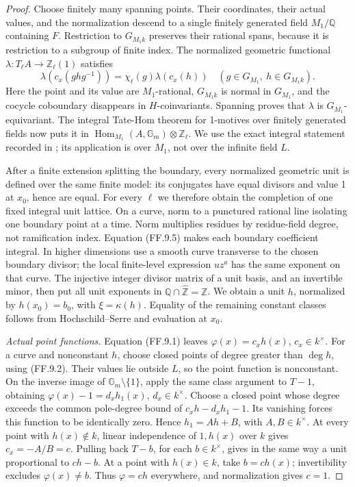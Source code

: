 \begin{proof}
Choose finitely many spanning points. Their coordinates, their
actual values, and the normalization descend to a single
finitely generated field \(M_1/\mathbb Q\) containing \(F\).
Restriction to \(G_{M_1k}\) preserves their rational spans,
because it is restriction to a subgroup of finite index.
The normalized geometric functional
\(\lambda:T_\ell A\to\mathbb Z_\ell(1)\) satisfies
\[
 \lambda(c_x(ghg^{-1}))
       =\chi_\ell(g)\lambda(c_x(h))
 \quad(g\in G_{M_1},\ h\in G_{M_1k}).
\]
Here the point and its value are \(M_1\)-rational,
\(G_{M_1k}\) is normal in \(G_{M_1}\), and the cocycle
coboundary disappears in \(H\)-coinvariants. Spanning proves
that \(\lambda\) is \(G_{M_1}\)-equivariant.
The integral Tate-Hom theorem for 1-motives over finitely generated
fields now puts it in
\(\operatorname{Hom}_{M_1}(A,\mathbb G_m)\otimes\mathbb Z_\ell\).
We use the exact integral statement recorded in
\citet[Section~1.4]{FF_Jossen2014}; its application is over
\(M_1\), not over the infinite field \(L\).

After a finite extension splitting the boundary, every normalized
geometric unit is defined over the same finite model: its conjugates
have equal divisors and value 1 at \(x_0\), hence are equal.
For every \(\ell\) we therefore obtain the completion of one
fixed integral unit lattice. On a curve, norm to a punctured
rational line isolating one boundary point at a time. Norm
multiplies residues by residue-field degree, not ramification
index. Equation (FF.9.5) makes each boundary coefficient integral.
In higher dimensions use a smooth curve transverse to the chosen
boundary divisor; the local finite-level expression \(uz^a\)
has the same exponent on that curve. The injective integer divisor
matrix of a unit basis, and an invertible minor, then put all unit
exponents in \(\mathbb Q\cap\widehat{\mathbb Z}=\mathbb Z\).
We obtain a unit \(h\), normalized by \(h(x_0)=b_0\), with
\(\xi=\kappa(h)\). Equality of the remaining constant classes
follows from Hochschild--Serre and evaluation at \(x_0\).

\emph{Actual point functions.}
Equation (FF.9.1) leaves \(\varphi(x)=c_xh(x)\), \(c_x\in k^\times\).
For a curve and nonconstant \(h\), choose closed points of
degree greater than \(\deg h\), using (FF.9.2). Their values
lie outside \(L\), so the point function is nonconstant.
On the inverse image of \(\mathbb G_m\setminus\{1\}\), apply
the same class argument to \(T-1\), obtaining
\(\varphi(x)-1=d_xh_1(x)\), \(d_x\in k^\times\).
Choose a closed point whose degree exceeds the common pole-degree
bound of \(c_xh-d_xh_1-1\). Its vanishing forces this function
to be identically zero. Hence \(h_1=Ah+B\), with
\(A,B\in k^\times\). At every point with \(h(x)\notin k\),
linear independence of \(1,h(x)\) over \(k\) gives
\(c_x=-A/B=c\). Pulling back \(T-b\), for each
\(b\in k^\times\), gives in the same way a unit proportional
to \(ch-b\). At a point with \(h(x)\in k\), take
\(b=ch(x)\); invertibility excludes \(\varphi(x)\ne b\).
Thus \(\varphi=ch\) everywhere, and normalization gives \(c=1\).


\end{proof}
